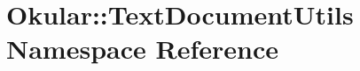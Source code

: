 \hypertarget{namespaceOkular_1_1TextDocumentUtils}{\section{Okular\+:\+:Text\+Document\+Utils Namespace Reference}
\label{namespaceOkular_1_1TextDocumentUtils}
}

